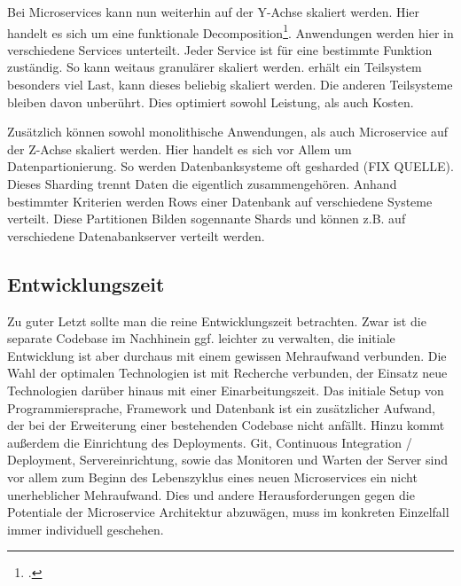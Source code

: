 Bei Microservices kann nun weiterhin auf der Y-Achse skaliert werden. Hier handelt es sich um eine funktionale Decomposition\footcite[][]{abbott2009art}. Anwendungen werden hier in verschiedene Services unterteilt. Jeder Service ist für eine bestimmte Funktion zuständig. So kann weitaus granulärer skaliert werden. erhält ein Teilsystem besonders viel Last, kann dieses beliebig skaliert werden. Die anderen Teilsysteme bleiben davon unberührt. Dies optimiert sowohl Leistung, als auch Kosten.

Zusätzlich können sowohl monolithische Anwendungen, als auch Microservice auf der Z-Achse skaliert werden. Hier handelt es sich vor Allem um Datenpartionierung. So werden Datenbanksysteme oft gesharded (FIX QUELLE). Dieses Sharding trennt Daten die eigentlich zusammengehören. Anhand bestimmter Kriterien werden Rows einer Datenbank auf verschiedene Systeme verteilt. Diese Partitionen Bilden sogennante Shards und können z.B. auf verschiedene Datenabankserver verteilt werden.

\subsection{Entwicklungszeit}
Zu guter Letzt sollte man die reine Entwicklungszeit betrachten. Zwar ist die separate Codebase im Nachhinein ggf. leichter zu verwalten, die initiale Entwicklung ist aber durchaus mit einem gewissen Mehraufwand verbunden. Die Wahl der optimalen Technologien ist mit Recherche verbunden, der Einsatz neue Technologien darüber hinaus mit einer Einarbeitungszeit. Das initiale Setup von Programmiersprache, Framework und Datenbank ist ein zusätzlicher Aufwand, der bei der Erweiterung einer bestehenden Codebase nicht anfällt. Hinzu kommt außerdem die Einrichtung des Deployments. Git, Continuous Integration / Deployment, Servereinrichtung, sowie das Monitoren und Warten der Server sind vor allem zum Beginn des Lebenszyklus eines neuen Microservices ein nicht unerheblicher Mehraufwand. Dies und andere Herausforderungen gegen die Potentiale der Microservice Architektur abzuwägen, muss im konkreten Einzelfall immer individuell geschehen.

